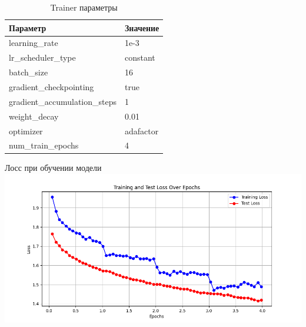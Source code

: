 \begin{longtable}{ll}
\caption{Trainer параметры} \\
\hline
\textbf{Параметр} & \textbf{Значение} \\
\hline
learning\_rate & 1e-3 \\
lr\_scheduler\_type & constant \\
batch\_size & 16 \\
gradient\_checkpointing & true \\
gradient\_accumulation\_steps & 1 \\
weight\_decay & 0.01 \\
optimizer & adafactor \\
num\_train\_epochs & 4 \\
\hline
\end{longtable}

\begin{FIGURE}[h]{Лосс при обучении модели \label{fig:loss-plot-epoch}}
\includegraphics[width=1.0\textwidth]{img/loss-plot-epoch}
\end{FIGURE}

